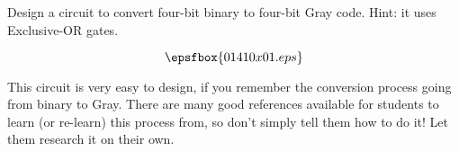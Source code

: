 

Design a circuit to convert four-bit binary to four-bit Gray code.  Hint: it uses Exclusive-OR gates.







$$\epsfbox{01410x01.eps}$$







This circuit is very easy to design, if you remember the conversion process going from binary to Gray.  There are many good references available for students to learn (or re-learn) this process from, so don't simply tell them how to do it!  Let them research it on their own.




